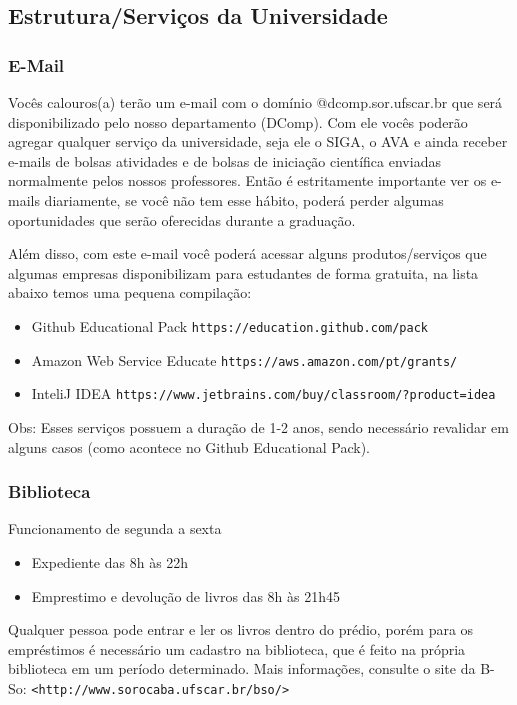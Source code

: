 \subsection{Estrutura/Serviços da Universidade}

\subsubsection{E-Mail}
Vocês calouros(a) terão um e-mail com o domínio @dcomp.sor.ufscar.br que será disponibilizado pelo nosso departamento (DComp). Com ele vocês poderão agregar qualquer serviço da universidade, seja ele o SIGA, o AVA e ainda receber e-mails de bolsas atividades e de bolsas de iniciação científica enviadas normalmente pelos nossos professores. Então é estritamente importante ver os e-mails diariamente, se você não tem esse hábito, poderá perder algumas oportunidades que serão oferecidas durante a graduação.

Além disso, com este e-mail você poderá acessar alguns produtos/serviços que algumas empresas disponibilizam para estudantes de forma gratuita, na lista abaixo temos uma pequena compilação:
\begin{itemize}
  \item Github Educational Pack \texttt{https://education.github.com/pack}
  \item Amazon Web Service Educate \texttt{https://aws.amazon.com/pt/grants/}
  \item InteliJ IDEA \texttt{https://www.jetbrains.com/buy/classroom/?product=idea}
\end{itemize}

Obs: Esses serviços possuem a duração de 1-2 anos, sendo necessário revalidar em alguns casos (como acontece no Github Educational Pack).

\subsubsection{Biblioteca}
\noindent Funcionamento de segunda a sexta
\begin{itemize}
  \item Expediente das 8h às 22h
  \item Emprestimo e devolução de livros das 8h às 21h45
\end{itemize}
\noindent Qualquer pessoa pode entrar e ler os livros dentro do prédio, porém para os empréstimos é necessário um cadastro na biblioteca, que é feito na própria biblioteca em um período determinado. Mais informações, consulte o site da B-So:
\texttt{<http://www.sorocaba.ufscar.br/bso/>}

